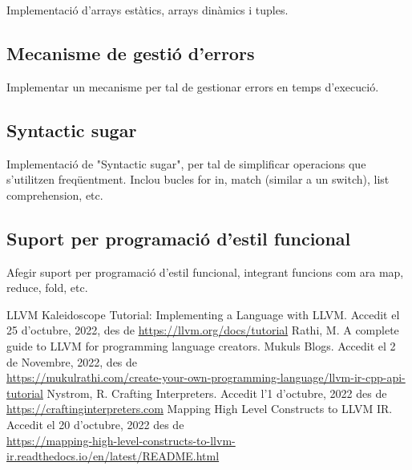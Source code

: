﻿\documentclass{article}
\begin{document}
Implementació d'arrays estàtics, arrays dinàmics i tuples.

\subsection{Mecanisme de gestió d'errors}
Implementar un mecanisme per tal de gestionar errors en temps d'execució.

\subsection{Syntactic sugar}
Implementació de "Syntactic sugar", per tal de simplificar operacions que
s'utilitzen freqüentment. Inclou bucles for in, match (similar a un switch),
list comprehension, etc.

\subsection{Suport per programació d'estil funcional}
Afegir suport per programació d'estil funcional, integrant funcions com ara map,
reduce, fold, etc.

\renewcommand\refname{Bibliografia}
\begin{thebibliography}{9}

 LLVM Kaleidoscope Tutorial: Implementing a Language with LLVM. Accedit el 25 d'octubre, 2022, des de \url{https://llvm.org/docs/tutorial}
 Rathi, M. A complete guide to LLVM for programming language creators. Mukuls Blogs. Accedit el 2 de Novembre, 2022, des de \\\url{https://mukulrathi.com/create-your-own-programming-language/llvm-ir-cpp-api-tutorial}
 Nystrom, R. Crafting Interpreters. Accedit l'1 d'octubre, 2022 des de \\\url{https://craftinginterpreters.com}
 Mapping High Level Constructs to LLVM IR. Accedit el 20 d'octubre, 2022 des de \\\url{https://mapping-high-level-constructs-to-llvm-ir.readthedocs.io/en/latest/README.html}

\end{thebibliography}
\end{document}
